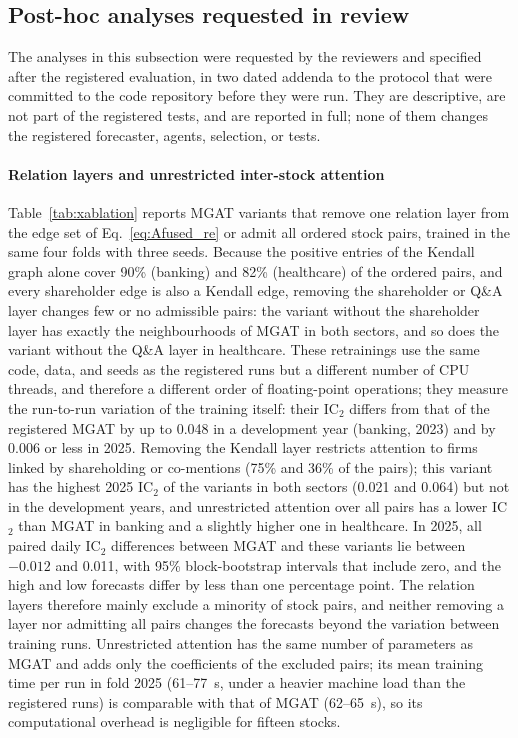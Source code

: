 \subsection{Post-hoc analyses requested in review}\label{subsec:posthoc}

{\color{blue}The analyses in this subsection were requested by the reviewers and specified after the registered evaluation, in two dated addenda to the protocol that were committed to the code repository before they were run. They are descriptive, are not part of the registered tests, and are reported in full; none of them changes the registered forecaster, agents, selection, or tests.

\paragraph{Relation layers and unrestricted inter-stock attention}
Table~\ref{tab:xablation} reports MGAT variants that remove one relation layer from the edge set of Eq.~\eqref{eq:Afused_re} or admit all ordered stock pairs, trained in the same four folds with three seeds. Because the positive entries of the Kendall graph alone cover 90\% (banking) and 82\% (healthcare) of the ordered pairs, and every shareholder edge is also a Kendall edge, removing the shareholder or Q\&A layer changes few or no admissible pairs: the variant without the shareholder layer has exactly the neighbourhoods of MGAT in both sectors, and so does the variant without the Q\&A layer in healthcare. These retrainings use the same code, data, and seeds as the registered runs but a different number of CPU threads, and therefore a different order of floating-point operations; they measure the run-to-run variation of the training itself: their IC$_2$ differs from that of the registered MGAT by up to 0.048 in a development year (banking, 2023) and by 0.006 or less in 2025. Removing the Kendall layer restricts attention to firms linked by shareholding or co-mentions (75\% and 36\% of the pairs); this variant has the highest 2025 IC$_2$ of the variants in both sectors (0.021 and 0.064) but not in the development years, and unrestricted attention over all pairs has a lower IC$_2$ than MGAT in banking and a slightly higher one in healthcare. In 2025, all paired daily IC$_2$ differences between MGAT and these variants lie between $-0.012$ and 0.011, with 95\% block-bootstrap intervals that include zero, and the high and low forecasts differ by less than one percentage point. The relation layers therefore mainly exclude a minority of stock pairs, and neither removing a layer nor admitting all pairs changes the forecasts beyond the variation between training runs. Unrestricted attention has the same number of parameters as MGAT and adds only the coefficients of the excluded pairs; its mean training time per run in fold 2025 (61--77~s, under a heavier machine load than the registered runs) is comparable with that of MGAT (62--65~s), so its computational overhead is negligible for fifteen stocks.

}
